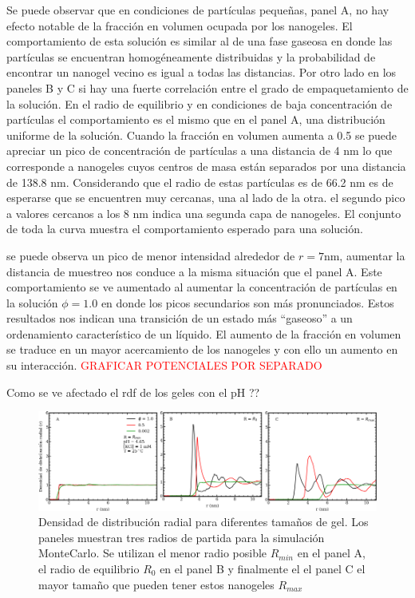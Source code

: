 Se puede observar que en condiciones de part\'iculas peque\~nas, panel A, no hay efecto notable de la fracci\'on en volumen ocupada por los nanogeles. El comportamiento de esta soluci\'on es similar al de una fase gaseosa en donde las part\'iculas se encuentran homog\'eneamente distribuidas y la probabilidad de encontrar un nanogel vecino es igual a todas las distancias.
Por otro lado en los paneles B y C si hay una fuerte correlaci\'on entre el grado de empaquetamiento de la soluci\'on.
En el radio de equilibrio y en condiciones de baja concentraci\'on de part\'iculas el comportamiento es el mismo que en el panel A, una distribuci\'on uniforme de la soluci\'on. Cuando la fracci\'on en volumen aumenta a 0.5 se puede apreciar un pico de concentraci\'on de part\'iculas a una distancia de 4 nm lo que corresponde a nanogeles cuyos centros de masa est\'an separados por una distancia de 138.8 nm. Considerando que el radio de estas part\'iculas es de 66.2 nm es de esperarse que se encuentren muy cercanas, una al lado de la otra. el segundo pico a valores cercanos a los 8 nm indica una segunda capa de nanogeles. El conjunto de toda la curva muestra el comportamiento esperado para una soluci\'on.


 se puede observa un pico de menor intensidad alrededor de $r = 7$nm, aumentar la distancia de muestreo nos conduce a la misma situaci\'on que el panel A.
Este comportamiento se ve aumentado al aumentar la concentraci\'on de part\'iculas en la soluci\'on $\phi = 1.0$ en donde los picos secundarios son más pronunciados.
Estos resultados nos indican una transici\'on de un estado m\'as ``gaseoso'' a un ordenamiento caracter\'istico de un l\'iquido. 
El aumento de la fracci\'on en volumen se traduce en un mayor acercamiento de los nanogeles y con ello un aumento en su interacci\'on. 
\textcolor{red}{GRAFICAR POTENCIALES POR SEPARADO}

Como se ve afectado el rdf de los geles con el pH ??

\begin{figure}[!tb]
	\centering
	\includegraphics[width=1\linewidth]{Figures/graph-mc/rdf-gels.pdf}
	\caption{Densidad de distribuci\'on radial para diferentes tama\~nos de gel. Los paneles muestran tres radios de partida para la simulaci\'on MonteCarlo. Se utilizan el menor radio posible $R_{min}$ en el panel A, el radio de equilibrio $R_0$ en el panel B y finalmente el el panel C el mayor tama\~no que pueden tener estos nanogeles $R_{max}$}
	\label{fig:mc:redf-gels-r}
\end{figure}



